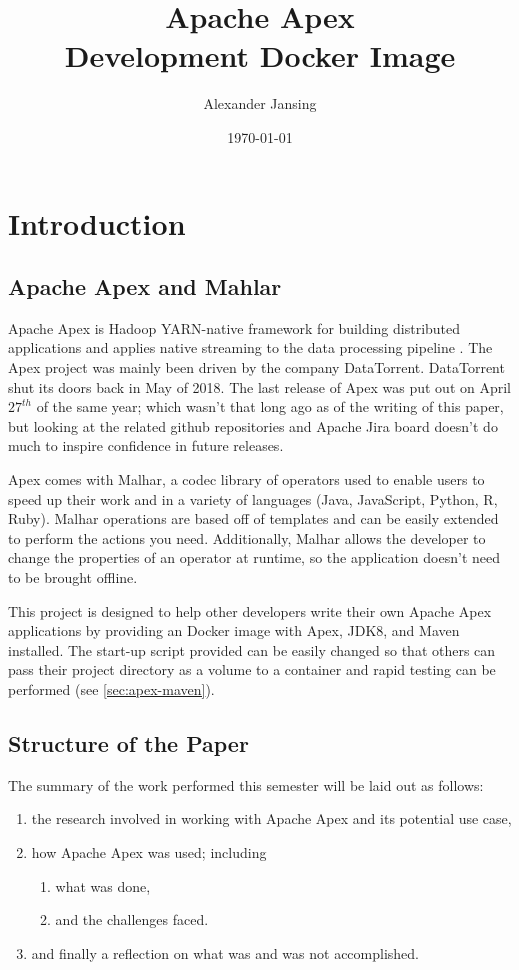 \documentclass[final]{IEEEtran}
\title{Apache Apex \\ \normalsize Development Docker Image}
\author{Alexander Jansing}
\date{\today}
\begin{document}
\maketitle



\section{Introduction}
\subsection{Apache Apex and Mahlar}
Apache Apex is Hadoop YARN-native framework for building distributed applications and applies native streaming to the data processing pipeline \cite{WEISE}. The Apex project was mainly been driven by the company DataTorrent. DataTorrent shut its doors back in May of 2018\cite{WIKI}\cite{DATANAMI}. The last release of Apex was put out on April $27^{th}$ of the same year; which wasn't that long ago as of the writing of this paper, but looking at the related github repositories and Apache Jira board doesn't do much to inspire confidence in future releases.

Apex comes with Malhar, a codec library of operators used to enable users to speed up their work and in a variety of languages (Java, JavaScript, Python, R, Ruby). Malhar operations are based off of templates and can be easily extended to perform the actions you need. Additionally, Malhar allows the developer to change the properties of an operator at runtime, so the application doesn't need to be brought offline\cite{MALHAR-DOCS}.

This project is designed to help other developers write their own Apache Apex applications by providing an Docker image with Apex, JDK8, and Maven installed. The start-up script provided can be easily changed so that others can pass their project directory as a volume to a container and rapid testing can be performed (see \ref{sec:apex-maven}).

\subsection{Structure of the Paper}
The summary of the work performed this semester will be laid out as follows:
\begin{enumerate}
  \item the research involved in working with Apache Apex and its potential use case,
  \item how Apache Apex was used; including
  \begin{enumerate}
    \item what was done,
    \item and the challenges faced.
  \end{enumerate}
  \item and finally a reflection on what was and was not accomplished.
\end{enumerate}
\end{document}
